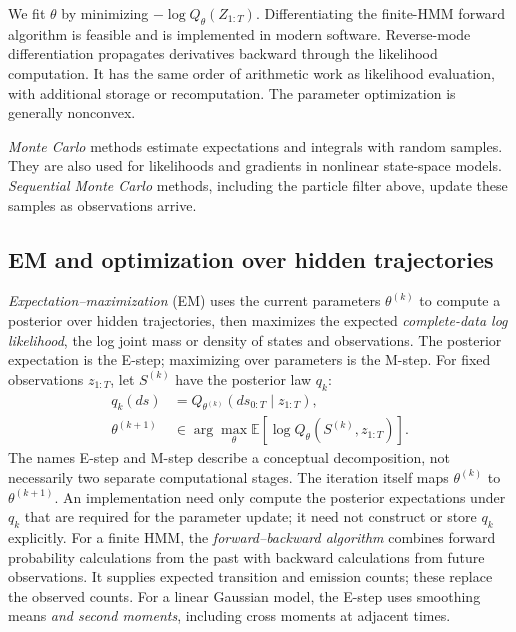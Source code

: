 \documentclass[11pt,twoside]{article}
\newcommand{\E}{\mathbb E}
\theoremstyle{definition}
\theoremstyle{remark}
\begin{document}
We fit \(\theta\) by minimizing \(-\log Q_\theta(Z_{1:T})\).
Differentiating the finite-HMM forward algorithm is feasible and is
implemented in modern software. Reverse-mode differentiation propagates
derivatives backward through the likelihood computation. It has
the same order of arithmetic work as likelihood evaluation, with
additional storage or recomputation. The parameter optimization is
generally nonconvex.

\emph{Monte Carlo} methods estimate expectations and integrals with random
samples. They are also used for likelihoods and gradients in nonlinear
state-space models. \emph{Sequential Monte Carlo} methods, including the
particle filter above, update these samples as observations arrive.

\subsection{EM and optimization over hidden trajectories}
\label{sec:em}

\emph{Expectation--maximization} (EM) uses the current parameters
\(\theta^{(k)}\) to compute a posterior over hidden trajectories,
then maximizes the expected \emph{complete-data log likelihood}, the log
joint mass or density of states and observations. The posterior expectation
is the E-step; maximizing over parameters is the M-step. For fixed
observations \(z_{1:T}\), let \(S^{(k)}\) have the posterior law \(q_k\):
\begin{align}
 q_k(ds)&=Q_{\theta^{(k)}}(ds_{0:T}\mid z_{1:T}),\nonumber\\
 \theta^{(k+1)}&\in\arg\max_\theta
 \E[\log Q_\theta(S^{(k)},z_{1:T})].
 \label{eq:em}
\end{align}
The names E-step and M-step describe a conceptual decomposition, not
necessarily two separate computational stages. The iteration itself maps
\(\theta^{(k)}\) to \(\theta^{(k+1)}\). An implementation need only compute
the posterior expectations under \(q_k\) that are required for the parameter
update; it need not construct or store \(q_k\) explicitly.
For a finite HMM, the \emph{forward--backward algorithm} combines forward
probability calculations from the past with backward calculations from
future observations. It supplies expected transition and
emission counts; these replace the observed counts. For a linear Gaussian model,
the E-step uses smoothing means \emph{and second moments}, including
cross moments at adjacent times.
\end{document}
